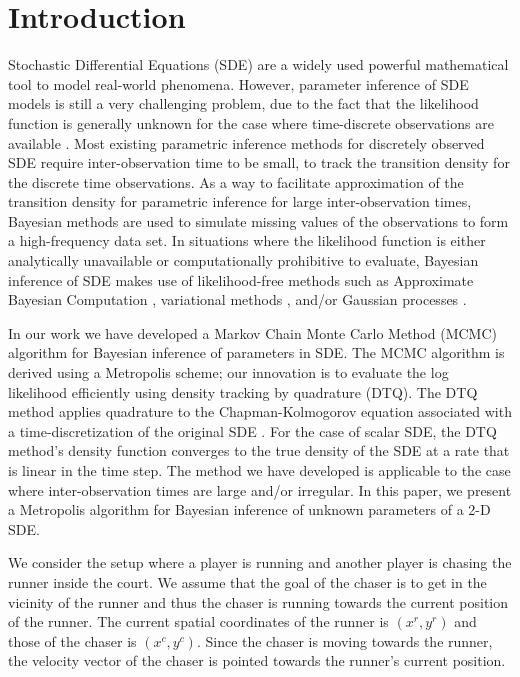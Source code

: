 \documentclass[graybox]{svmult}
\begin{document}
\section{Introduction}
\label{sec:1}
Stochastic Differential Equations (SDE) are a widely used powerful mathematical tool to model real-world phenomena. However, parameter inference of SDE models is still a 
very challenging problem, due to the fact that the likelihood function is generally unknown for the case where time-discrete observations are available \cite{sorensen2004parametric, iacus2009simulation, fuchs2013inference}. Most existing parametric inference methods for discretely observed SDE require inter-observation time to be small, to track the transition density for the discrete time observations. As a way to facilitate approximation of the transition density for parametric inference for large inter-observation times, Bayesian methods are used to simulate missing values of the observations to form a high-frequency data set. In situations where the likelihood function is either analytically unavailable or computationally prohibitive to evaluate, Bayesian inference of SDE makes use of likelihood-free methods such as Approximate Bayesian Computation \cite{Picchini2014}, variational methods \cite{Archambeau2007a, Vrettas2015}, and/or Gaussian processes \cite{Archambeau2007, Ruttor2013}.


In our work we have developed a Markov Chain Monte Carlo Method (MCMC) algorithm for Bayesian inference of parameters in SDE.  The MCMC algorithm is derived using a Metropolis scheme; our innovation is to evaluate the log likelihood efficiently using density tracking by quadrature (DTQ).  The DTQ method applies quadrature to the Chapman-Kolmogorov equation associated with a time-discretization of the original SDE \cite{BhatMadu2016}. For the case of scalar SDE, the DTQ method's density function converges to the true density of the SDE at a rate that is linear in the time step.  The method we have developed is applicable to the case where inter-observation times are large and/or irregular.  In this paper, we present a Metropolis algorithm for Bayesian inference of unknown parameters of a 2-D SDE.

We consider the setup where a player is running and another player is chasing the runner inside the court. We assume that the goal of the chaser is to get in the vicinity of the runner and thus the chaser is running towards the current position of the runner. The current spatial coordinates of the runner is $(x^{r}, y^{r})$ and those of the chaser is $(x^{c}, y^{c})$. Since the chaser is moving towards the runner, the velocity vector of the chaser is pointed towards the runner's current position.
\end{document}
